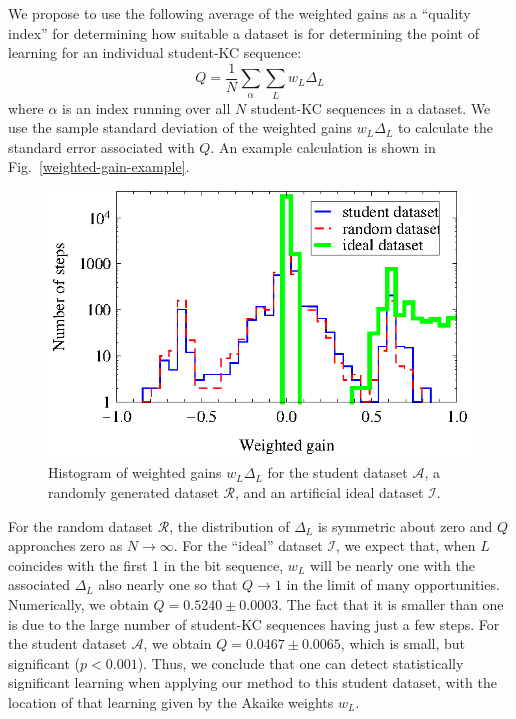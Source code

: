\documentclass{edm_template}
\begin{document}
We propose to use the following average of the weighted gains as
a ``quality index'' for determining how suitable a 
dataset is for determining the point of learning for an individual
student-KC sequence:
%
\begin{equation}
           Q= \frac{1}{N} \sum_\alpha \sum_L w_L \Delta_L
\end{equation}
%
where $\alpha$ is an index running over all $N$ student-KC sequences in a 
dataset.
We use the sample standard deviation of the weighted gains $w_L \Delta_L$
to calculate the standard error associated with $Q$. 
An example calculation is shown in Fig.~\ref{weighted-gain-example}.

\begin{figure}
  \centering \includegraphics{weighted-gain-histogram2.eps}
   \caption{Histogram of weighted gains $w_L \Delta_L$ for
     the student dataset $\mathcal{A}$, 
     a randomly generated dataset $\mathcal{R}$,
     and an artificial ideal dataset $\mathcal{I}$.}
    \label{weighted-gain-histogram2}
\end{figure}

For the random dataset $\mathcal{R}$, the distribution of $\Delta_L$
is symmetric about zero and $Q$ approaches zero as $N \to \infty$.
For the ``ideal'' dataset $\mathcal{I}$, we expect that, when
$L$ coincides with the first 1 in
the bit sequence, $w_L$ will be nearly one with the associated $\Delta_L$
also nearly one so that $Q\to 1$ in the limit of many opportunities.
Numerically, we obtain $Q=0.5240\pm0.0003$.  The fact that it is
smaller than one is due to the large number of student-KC sequences having
just a few steps.  For the student dataset $\mathcal{A}$, we obtain
$Q=0.0467\pm0.0065$, which is small, but significant
($p<0.001$). Thus, we conclude that one can detect statistically
significant learning when applying our method to this student dataset,
with the location of that learning given by the Akaike weights $w_L$.
\end{document}
